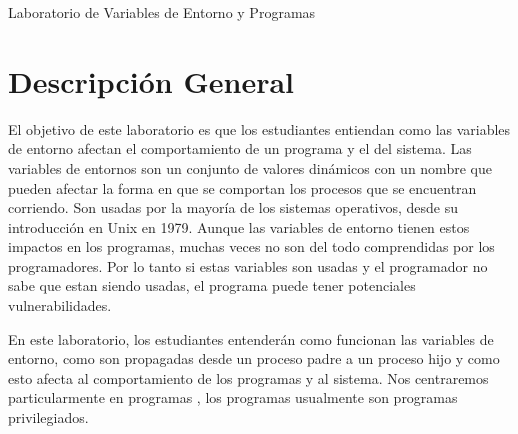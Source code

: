 
\newcommand{\commonfolder}{../../common-files}










\begin{center}
{\LARGE Laboratorio de Variables de Entorno y Programas \setuid }
\end{center}



\section{Descripción General}

El objetivo de este laboratorio es que los estudiantes entiendan como las variables de entorno afectan el comportamiento de un programa y el del sistema. Las variables de entornos son un conjunto de valores dinámicos con un nombre que pueden afectar la forma en que se comportan los procesos que se encuentran corriendo. Son usadas por la mayoría de los sistemas operativos, desde su introducción en Unix en 1979. Aunque las variables de entorno tienen estos impactos en los programas, muchas veces no son del todo comprendidas por los programadores. Por lo tanto si estas variables son usadas y el programador no sabe que estan siendo usadas, el programa puede tener potenciales vulnerabilidades.

En este laboratorio, los estudiantes entenderán como funcionan las variables de entorno, como son propagadas desde un proceso padre a un proceso hijo y como esto afecta al comportamiento de los programas y al sistema. Nos centraremos particularmente en programas \setuid, los programas \setuid usualmente son programas privilegiados.

